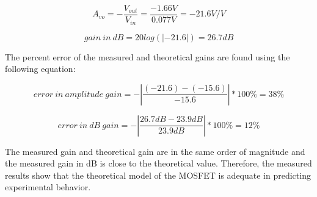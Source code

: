 \FloatBarrier

\begin{equation}
	\label{eq:measured_gain}
	A_{vo} = - \frac{V_{out}}{V_{in}} = \frac{-1.66 V}{0.077 V} = -21.6 V/V
\end{equation}

\begin{equation}
	\label{eq:measured_gain_db}
	gain \ in \ dB = 20 log(|-21.6|) = 26.7 dB
\end{equation}

\FloatBarrier

The percent error of the measured and theoretical gains are found using the following equation:

\begin{equation}
	\label{eq:error}
	error \ in \ amplitude \ gain = - |\frac{(-21.6) - (-15.6)}{-15.6}| * 100\% = 38\%
\end{equation}

\begin{equation}
	\label{eq:error_db}
        error \ in \ dB \ gain = - |\frac{26.7 dB - 23.9 dB}{23.9 dB}| * 100\% = 12\%
\end{equation}

 The measured gain and theoretical gain are in the same order of magnitude and the measured gain in dB is close to the theoretical value.
 Therefore, the measured results show that the theoretical model of the MOSFET is adequate in predicting experimental behavior.
